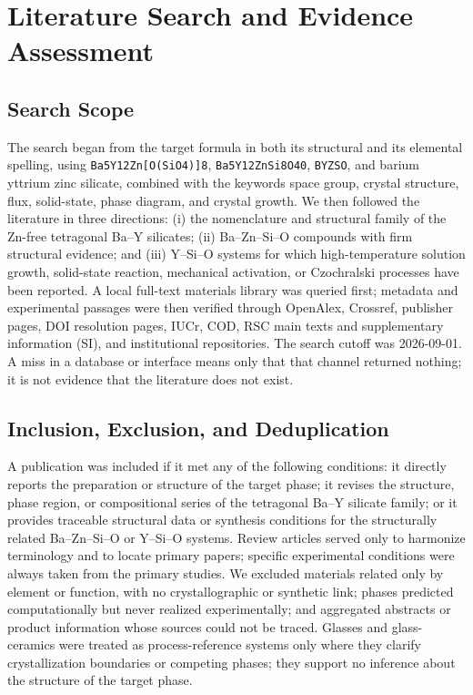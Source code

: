 \section{Literature Search and Evidence Assessment}
\label{sec:review-method}

\subsection{Search Scope}

The search began from the target formula in both its structural and its elemental spelling, using \texttt{Ba5Y12Zn[O(SiO4)]8}, \texttt{Ba5Y12ZnSi8O40}, \texttt{BYZSO}, and barium yttrium zinc silicate, combined with the keywords space group, crystal structure, flux, solid-state, phase diagram, and crystal growth. We then followed the literature in three directions: (i) the nomenclature and structural family of the Zn-free tetragonal Ba--Y silicates; (ii) Ba--Zn--Si--O compounds with firm structural evidence; and (iii) Y--Si--O systems for which high-temperature solution growth, solid-state reaction, mechanical activation, or Czochralski processes have been reported. A local full-text materials library was queried first; metadata and experimental passages were then verified through OpenAlex, Crossref, publisher pages, DOI resolution pages, IUCr, COD, RSC main texts and supplementary information (SI), and institutional repositories. The search cutoff was 2026-09-01. A miss in a database or interface means only that that channel returned nothing; it is not evidence that the literature does not exist.

\subsection{Inclusion, Exclusion, and Deduplication}

A publication was included if it met any of the following conditions: it directly reports the preparation or structure of the target phase; it revises the structure, phase region, or compositional series of the tetragonal Ba--Y silicate family; or it provides traceable structural data or synthesis conditions for the structurally related Ba--Zn--Si--O or Y--Si--O systems. Review articles served only to harmonize terminology and to locate primary papers; specific experimental conditions were always taken from the primary studies. We excluded materials related only by element or function, with no crystallographic or synthetic link; phases predicted computationally but never realized experimentally; and aggregated abstracts or product information whose sources could not be traced. Glasses and glass-ceramics were treated as process-reference systems only where they clarify crystallization boundaries or competing phases; they support no inference about the structure of the target phase.

